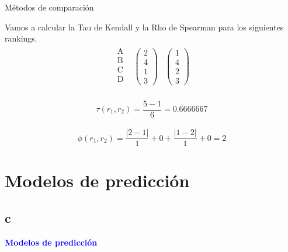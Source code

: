 \documentclass{beamer}
\begin{document}
	\begin{frame}{Métodos de comparación}	
		\begin{ejem}		
			Vamos a calcular la Tau de Kendall y la Rho de Spearman para los siguientes rankings. 	
			$$\begin{array}{ccc}
			\begin{array}{c}
			\text{A}\\
			\text{B} \\
			\text{C} \\
			\text{D} \\
			\end{array} & \left(\begin{array}{c}
			2\\
			4\\
			1\\
			3
			\end{array} \right)& \left(\begin{array}{c}
			1\\
			4\\
			2\\
			3
			\end{array} \right)
			\end{array}$$  \\
			$$ \tau (r_{1},r_{2}) = \dfrac{5-1}{6}=0.6666667$$\\
			$$ \phi (r_{1},r_{2}) = \frac{|2-1|}{1} + 0 + \frac{|1-2|}{1} + 0 = 2$$
		\end{ejem}
	\end{frame}	

	\section{Modelos de predicción}
	\subsection{c}
	\begin{frame}
		\begin{center}
			\Huge\textbf{\textsf{\textcolor{blue}{Modelos de predicción}}}
		\end{center}
	\end{frame}	
	
\end{document}
